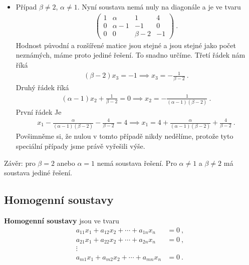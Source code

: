 \begin{example}
\begin{itemize}
        \item Případ $\beta \neq 2$, $\alpha \neq 1$. Nyní soustava nemá nuly na diagonále a je ve tvaru
        \begin{align}
            \left(\begin{array}{rrr|r}
                1 & \alpha & 1 & 4 \\ 0 & \alpha - 1 & -1 & 0 \\ 0 & 0 & \beta - 2 & -1 
            \end{array}\right)
            \:.
        \end{align}
        Hodnost původní a rozšířené matice jsou stejné a jsou stejné jako počet neznámých, máme proto jediné řešení. To snadno určíme. Třetí řádek nám říká
        \begin{align}
            (\beta - 2 ) x_3 = -1 \implies x_3 = - \frac{1}{\beta - 2} \:.
        \end{align}
        Druhý řádek říká
        \begin{align}
            (\alpha - 1 ) x_2 + \frac{1}{\beta - 2} = 0 \implies x_2 = - \frac{1}{(\alpha - 1)(\beta - 2)} \:.
        \end{align}
        První řádek Je
        \begin{align}
            x_1 - \frac{\alpha}{(\alpha - 1)(\beta - 2)} - \frac{4}{\beta - 2} = 4
            \implies x_1 = 4 + \frac{\alpha}{(\alpha - 1)(\beta - 2)} + \frac{4}{\beta - 2} \:.
        \end{align}
        Povšimněme si, že nulou v tomto případě nikdy nedělíme, protože tyto speciální případy jsme právě vyřešili výše.
    \end{itemize}

    Závěr: pro $\beta = 2$ anebo $\alpha = 1$ nemá soustava řešení. Pro $\alpha \neq 1$ a $\beta \neq 2$ má soustava jediné řešení.
\end{example}

\subsection*{Homogenní soustavy}

\textbf{Homogenní soustavy} jsou ve tvaru
\begin{align}
    a_{11} x_1 + a_{12} x_2  + \cdots + a_{1n} x_n &= 0 \:, \\
    a_{21} x_1 + a_{22} x_2  + \cdots + a_{2n} x_n &= 0 \:, \\
    \vdots \\
    a_{m1} x_1 + a_{m2} x_2  + \cdots + a_{mn} x_n &= 0 \:.
\end{align}

